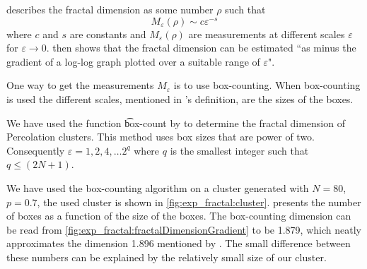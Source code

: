 
\textcite{falconer2004fractal} describes the fractal dimension as some number $\rho$ such that
\begin{equation}
	M_\varepsilon(\rho) \sim c\varepsilon^{-s}
\end{equation}
where $c$ and $s$ are constants and $M_\varepsilon(\rho)$ are measurements at different scales $\varepsilon$ for $\varepsilon \to 0$. \citeauthor{falconer2004fractal} then shows that the fractal dimension can be estimated ``as minus the gradient of a log-log graph plotted over a suitable range of $\varepsilon$"\cite{falconer2004fractal}. 

One way to get the measurements $M_\varepsilon$ is to use box-counting. When box-counting is used the different scales, mentioned in \citeauthor{falconer2004fractal}'s definition, are the sizes of the boxes.

We have used the function \t{box-count} by \textcite{boxCounting} to determine the fractal dimension of Percolation clusters. This method uses box sizes that are power of two. Consequently $\varepsilon = 1, 2, 4, \dotsc 2^q$ where $q$ is the smallest integer such that $q \leq (2N + 1)$. 

We have used the box-counting algorithm on a cluster generated with $N = 80$, $p = 0.7$, the used cluster is shown in \cref{fig:exp_fractal:cluster}.  presents the number of boxes as a function of the size of the boxes. The box-counting dimension can be read from \cref{fig:exp_fractal:fractalDimensionGradient} to be \num{1.879}, which neatly approximates the dimension \num{1.896} mentioned by \textcite{stauffer1994introduction}.  The small difference between these numbers can be explained by the relatively small size of our cluster. 

